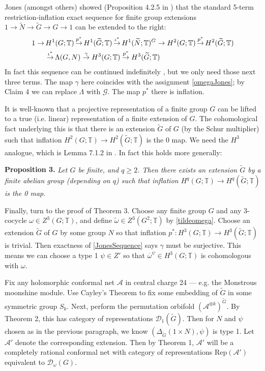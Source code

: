 \documentclass[12pt]{article}
\numberwithin{equation}{section}
\def\cA            {{\mathcal{A}}}
\def\cD            {{\mathcal{D}}}
\def\cG            {{\mathcal{G}}}
\def\bbT           {\mathbb{T}}
\begin{document}
Jones  (amongst others) showed (Proposition 4.2.5 in \cite{Jon2}) that the standard 5-term restriction-inflation exact sequence for finite group extensions
$1\rightarrow \widetilde{N}\rightarrow \widetilde{G}\rightarrow {G}\rightarrow 1$ can be extended to the right:
\begin{align}%
1\rightarrow &\,H^1(G;\bbT)\,{\buildrel p^*\over\rightarrow} \,H^1(\widetilde{G};\bbT)\,{\buildrel \iota^*\over\rightarrow} \,H^1(\widetilde{N};\bbT)^{{G}}\rightarrow H^2({G};\bbT)\,{\buildrel p^*\over\rightarrow} \,H^2(\widetilde{G};\bbT)\nonumber\\ &\,\,{\buildrel \iota^*\over\rightarrow} \,\Lambda(G,N)
\;{\buildrel\gamma\over\rightarrow}\;H^3({G};\bbT)\;{\buildrel p^*\over\rightarrow}\; H^3(\widetilde{G};\bbT)\label{JonesSequence}\end{align}
In fact this sequence can be continued indefinitely \cite{HJPR}, but we only need those next three terms.
The map $\gamma$ here coincides with the assignment \eqref{omegaJones}; by Claim 4 we can replace $\Lambda$ with $\cG$. The map $p^*$ there is inflation. 

It is well-known that a projective representation of a finite group $G$ can be lifted 
to a true (i.e. linear) representation of a finite extension of $G$. The cohomological fact underlying this
is that there is an extension $\widetilde{G}$ of $G$ (by the Schur multiplier) such that inflation
$H^2(G;\bbT)\rightarrow H^2(\widetilde{G};\bbT)$ is the 0 map. We need the $H^3$ analogue, which
is Lemma 7.1.2 in \cite{Jon2}. In fact this holds more generally:

\medskip\noindent\textbf{Proposition 3.} \cite{Op} \textit{Let $G$ be finite, and $q\ge 2$.
Then there exists an extension $\widetilde{G}$ by a finite abelian group (depending on $q$)  such that inflation
$H^q(G;\bbT)\rightarrow H^q(\widetilde{G};\bbT)$ is the 0 map.}\medskip

Finally, turn to the proof of Theorem 3. 
Choose any finite group $G$ and any 3-cocycle $\omega
\in Z^3(G;\bbT)$, and define $\widetilde{\omega}\in Z^3(G^2;\bbT)$ by \eqref{tildeomega}.
Choose an extension $\widetilde{G}$ of $G$ by some group $N$ so that inflation $p^*:H^3(G;\bbT)
\rightarrow H^3(\widetilde{G};\bbT)$ is trivial. Then exactness of \eqref{JonesSequence} says $\gamma$ must be surjective. This means we can choose a type 1 $\psi\in Z'$ so that $\overline{\omega}^\psi\in
H^3(G;\bbT)$ is cohomologous with $\omega$.

Fix any holomorphic conformal net $\cA$ in central charge 24 --- e.g. the Monstrous moonshine module. Use Cayley's Theorem to fix some embedding of $\widetilde{G}$ in some symmetric group $S_k$. Next, perform the permutation orbifold   $(\cA^{\otimes k})^{\tilde{G}}$. By Theorem 2,
this has category of representations $\cD_1(\widetilde{G})$. Then for $N$ and $\psi$ chosen as in the
previous paragraph, we know $(\Delta_{\tilde{G}}(1\times N),\psi)$ is type 1. Let $\cA'$ denote the
corresponding extension. Then by Theorem 1, $\cA'$ will be a completely rational conformal net with category of representations Rep$(\cA')$ equivalent to $\cD_\omega(G)$.
\end{document}
